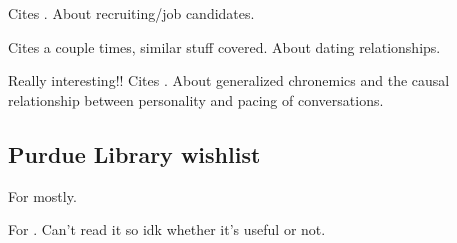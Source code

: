 \documentclass[
]{article}
\begin{document}
\textbf{}

Cites \textcite{walther95}. About recruiting/job candidates.

\textbf{}

Cites \textcite{walther95} a couple times, similar stuff covered. About
dating relationships.

\textbf{}

Really interesting!! Cites \textcite{walther95}. About generalized
chronemics and the causal relationship between personality and pacing of
conversations.

\hypertarget{purdue-library-wishlist}{%
\subsection{Purdue Library wishlist}\label{purdue-library-wishlist}}


For \textcite{doring09} mostly.


For \textcite{walther02}. Can't read it so idk whether it's useful or
not.

\printbibliography
\end{document}
